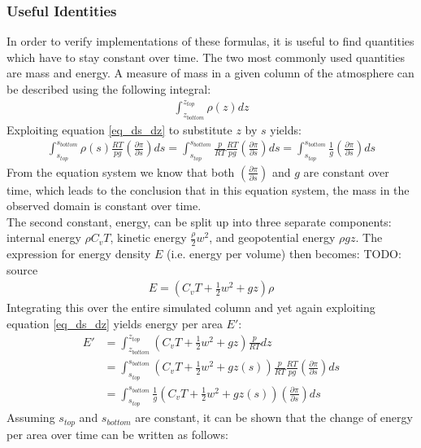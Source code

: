 \subsubsection{Useful Identities}
In order to verify implementations of these formulas, it is useful to find quantities which have to stay constant over time.
The two most commonly used quantities are mass and energy.
A measure of mass in a given column of the atmosphere can be described using the following integral:
\begin{align*}
\int_{z_{bottom}}^{z_{top}}\rho(z)dz
\end{align*}
Exploiting equation \ref{eq_ds_dz} to substitute $z$ by $s$ yields:
\begin{align}\label{eq_mass_conservation}
\int_{s_{top}}^{s_{bottom}}\rho(s)\frac{RT}{pg} \left( \frac{\partial \pi}{\partial s} \right) ds = \int_{s_{top}}^{s_{bottom}}\frac{p}{RT}\frac{RT}{pg} \left( \frac{\partial \pi}{\partial s} \right) ds = \int_{s_{top}}^{s_{bottom}}\frac{1}{g}\left( \frac{\partial \pi}{\partial s} \right) ds
\end{align}
From the equation system we know that both $\left( \frac{\partial \pi}{\partial s} \right)$ and $g$ are constant over time, which leads to the conclusion that in this equation system, the mass in the observed domain is constant over time.
\\
The second constant, energy, can be split up into three separate components: internal energy $\rho C_vT$, kinetic energy $\frac{\rho}{2}w^2$, and geopotential energy $\rho gz$.
The expression for energy density $E$ (i.e. energy per volume) then becomes: TODO: source
\begin{align*}
E = (C_vT+\frac{1}{2}w^2 + gz)\rho
\end{align*}
Integrating this over the entire simulated column and yet again exploiting equation \ref{eq_ds_dz} yields energy per area $E'$:
\begin{align}
E' &= \int_{z_{bottom}}^{z_{top}} (C_vT+\frac{1}{2}w^2 + gz)\frac{p}{RT} dz\nonumber\\
&=  \int_{s_{top}}^{s_{bottom}} (C_vT+\frac{1}{2}w^2 + gz(s))\frac{p}{RT}\frac{RT}{pg} \left( \frac{\partial \pi}{\partial s} \right) ds\nonumber\\
&=  \int_{s_{top}}^{s_{bottom}} \frac{1}{g}(C_vT+\frac{1}{2}w^2 + gz(s)) \left( \frac{\partial \pi}{\partial s} \right) ds\label{eq_energy}
\end{align}
Assuming $s_{top}$ and $s_{bottom}$ are constant, it can be shown that the change of energy per area over time can be written as follows:
